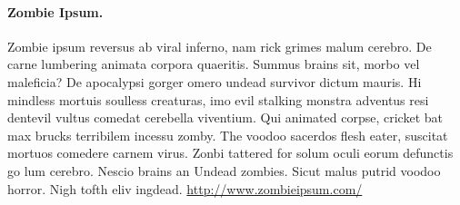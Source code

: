 \documentclass[12pt,        %
  english,ngerman,          %
  paper=a4,                 %
  captions=tablesignature,  %
  listof=numbered,          %
  bibliography=totoc,       %
  headings=small,           %
  headinclude=false,        %
  footinclude=false,        %
  parskip=half-,            %
  oneside,                  %
  DIV=12                    %
]{styles/coliartcl}
\begin{document}
\paragraph*{Zombie Ipsum.}  Zombie ipsum reversus ab viral inferno, nam rick grimes malum cerebro. De carne lumbering animata corpora quaeritis. Summus brains sit, morbo vel maleficia? De apocalypsi gorger omero undead survivor dictum mauris. Hi mindless mortuis soulless creaturas, imo evil stalking monstra adventus resi dentevil vultus comedat cerebella viventium. Qui animated corpse, cricket bat max brucks terribilem incessu zomby. The voodoo sacerdos flesh eater, suscitat mortuos comedere carnem virus. Zonbi tattered for solum oculi eorum defunctis go lum cerebro. Nescio brains an Undead zombies. Sicut malus putrid voodoo horror. Nigh tofth eliv ingdead.
\url{http://www.zombieipsum.com/}





\end{document}

